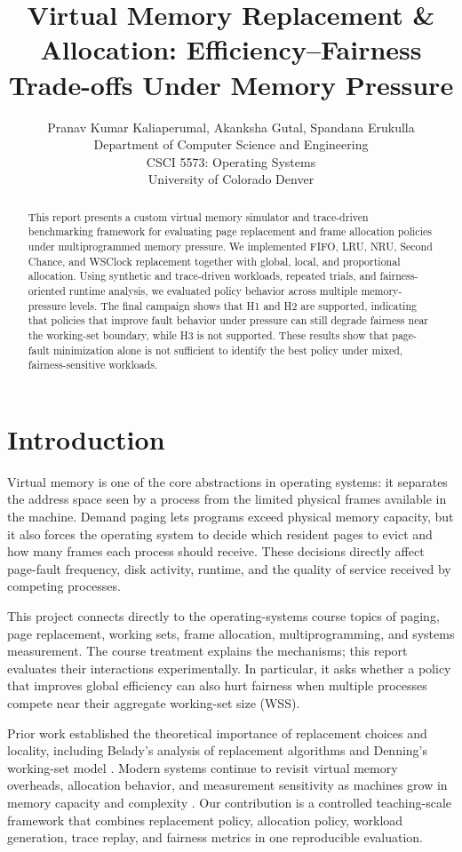 \documentclass[conference]{IEEEtran}
\title{Virtual Memory Replacement \& Allocation: Efficiency--Fairness Trade-offs Under Memory Pressure}
\author{%
  Pranav Kumar Kaliaperumal, Akanksha Gutal, Spandana Erukulla\\
  Department of Computer Science and Engineering\\
  CSCI 5573: Operating Systems\\
  University of Colorado Denver\\
}
\begin{document}
\maketitle

\begin{abstract}
This report presents a custom virtual memory simulator and trace-driven benchmarking framework for evaluating page replacement and frame allocation policies under multiprogrammed memory pressure. We implemented FIFO, LRU, NRU, Second Chance, and WSClock replacement together with global, local, and proportional allocation. Using synthetic and trace-driven workloads, repeated trials, and fairness-oriented runtime analysis, we evaluated policy behavior across multiple memory-pressure levels. The final campaign shows that H1 and H2 are supported, indicating that policies that improve fault behavior under pressure can still degrade fairness near the working-set boundary, while H3 is not supported. These results show that page-fault minimization alone is not sufficient to identify the best policy under mixed, fairness-sensitive workloads.
\end{abstract}

\section{Introduction}
Virtual memory is one of the core abstractions in operating systems: it separates the address space seen by a process from the limited physical frames available in the machine. Demand paging lets programs exceed physical memory capacity, but it also forces the operating system to decide which resident pages to evict and how many frames each process should receive. These decisions directly affect page-fault frequency, disk activity, runtime, and the quality of service received by competing processes.

This project connects directly to the operating-systems course topics of paging, page replacement, working sets, frame allocation, multiprogramming, and systems measurement. The course treatment explains the mechanisms; this report evaluates their interactions experimentally. In particular, it asks whether a policy that improves global efficiency can also hurt fairness when multiple processes compete near their aggregate working-set size (WSS).

Prior work established the theoretical importance of replacement choices and locality, including Belady's analysis of replacement algorithms and Denning's working-set model \cite{Belady1966,Denning1968,Denning1970}. Modern systems continue to revisit virtual memory overheads, allocation behavior, and measurement sensitivity as machines grow in memory capacity and complexity \cite{Basu2013,Park2020,Powers2019,Mytkowicz2009}. Our contribution is a controlled teaching-scale framework that combines replacement policy, allocation policy, workload generation, trace replay, and fairness metrics in one reproducible evaluation.
\end{document}
